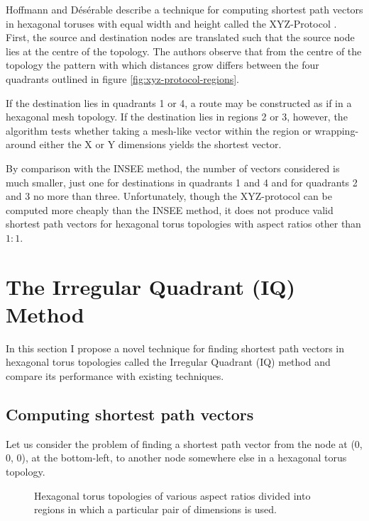 				Hoffmann and D\'es\'erable describe a technique for computing shortest
				path vectors in hexagonal toruses with equal width and height called
				the XYZ-Protocol \cite{hoffmann15,hoffmann11}. First, the source and
				destination nodes are translated such that the source node lies at the
				centre of the topology. The authors observe that from the centre of the
				topology the pattern with which distances grow differs between the four
				quadrants outlined in figure \ref{fig:xyz-protocol-regions}.
				
				If the destination lies in quadrants 1 or 4, a route may be constructed
				as if in a hexagonal mesh topology. If the destination lies in regions
				2 or 3, however, the algorithm tests whether taking a mesh-like vector
				within the region or wrapping-around either the X or Y dimensions
				yields the shortest vector.
				
				By comparison with the INSEE method, the number of vectors considered
				is much smaller, just one for destinations in quadrants 1 and 4 and for
				quadrants 2 and 3 no more than three. Unfortunately, though the
				XYZ-protocol can be computed more cheaply than the INSEE method, it
				does not produce valid shortest path vectors for hexagonal torus
				topologies with aspect ratios other than $1:1$.
		
	\section{The Irregular Quadrant (IQ) Method}
		
		In this section I propose a novel technique for finding shortest path
		vectors in hexagonal torus topologies called the Irregular Quadrant (IQ)
		method and compare its performance with existing techniques.
		
		\subsection{Computing shortest path vectors}
		
			Let us consider the problem of finding a shortest path vector from the node
			at (0, 0, 0), at the bottom-left, to another node somewhere else in a
			hexagonal torus topology.
			
			\begin{figure}
				\center
				
				\caption{Hexagonal torus topologies of various aspect ratios divided
				into regions in which a particular pair of dimensions is used.}
				\label{fig:shortest-path-regions}
			\end{figure}
			
